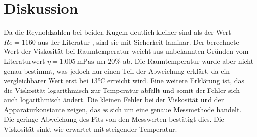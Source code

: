 \section{Diskussion}
\label{sec:Diskussion}
Da die Reynoldzahlen bei beiden Kugeln deutlich kleiner sind als der
Wert $Re=1160$ aus der Literatur \cite{geschke}, sind sie mit Sicherheit laminar.
Der berechnete Wert der Viskosität bei Raumtemperatur weicht aus unbekannten
Gründen vom Literaturwert $\eta=\SI{1.005}{\meter\pascal\second}$\cite{geschke}
um $20\%$ ab. Die Raumtemperatur wurde aber nicht genau bestimmt, was jedoch nur
einen Teil der Abweichung erklärt, da ein vergleichbarer Wert erst bei
$13\si{\celsius}$ erreicht wird. Eine weitere Erklärung ist, das die Viskosität
logarithmisch zur Temperatur abfällt und somit der Fehler sich auch logarithmisch
ändert. Die kleinen Fehler bei der Viskosität und der Apparaturkonstante zeigen,
das es sich um eine genaue Messmethode handelt. Die geringe Abweichung des Fits
von den Messwerten bestätigt dies. Die Viskosität sinkt wie erwartet mit steigender
Temperatur.
